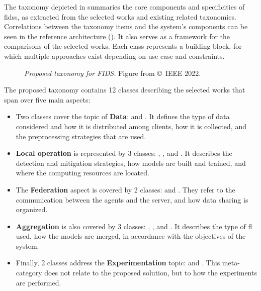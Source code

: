 The taxonomy depicted in  summaries the core components and specificities of \glspl{fids}, as extracted from the selected works and existing related taxonomies.
Correlations between the taxonomy items and the system's components can be seen in the reference architecture ().
It also serves as a framework for the comparisons of the selected works.
Each class represents a building block, for which multiple approaches exist depending on use case and constraints.

\begin{figure}
  \centering
  \resizebox{\textwidth}{!}{}
  \caption[
    Proposed taxonomy for FIDS.
  ]{
   \emph{Proposed taxonomy for FIDS.}
    Figure from \textcite{lavaur_EvolutionFederatedLearningbased_2022} \copyright~IEEE 2022.
    \label{fig:sota.taxonomy}
  }
\end{figure}


The proposed taxonomy contains 12 classes describing the selected works that span over five main aspects:
\begin{itemize}
  \item Two classes cover the topic of \textbf{Data}: \emph{} and \emph{}.
  It defines the type of data considered and how it is distributed among clients, how it is collected, and the preprocessing strategies that are used.
  
  \item \textbf{Local operation} is represented by 3 classes: \emph{}, \emph{}, and \emph{}.
  It describes the detection and mitigation strategies, how models are built and trained, and where the computing resources are located.
  
  \item The \textbf{Federation} aspect is covered by 2 classes: \emph{} and \emph{}.
  They refer to the communication between the agents and the server, and how data sharing is organized.
  
  \item \textbf{Aggregation} is also covered by 3 classes: \emph{}, \emph{}, and \emph{}.
  It describes the type of \gls{fl} used, how the models are merged, in accordance with the objectives of the system.
  
  \item Finally, 2 classes address the \textbf{Experimentation} topic: \emph{} and \emph{}.
  This meta-category does not relate to the proposed solution, but to how the experiments are performed.
\end{itemize}




